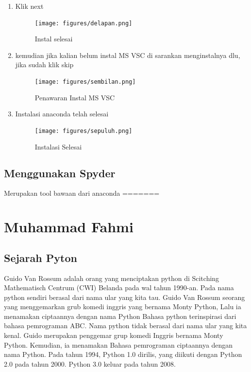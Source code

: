 \begin{enumerate}
    \item Klik next
    \begin{figure}[!htbp]
        \centering
        \texttt{[image: figures/delapan.png]}
        \caption{Instal selesai}
        \label{Proses}
        \end{figure}

    \item kemudian jika kalian belum instal MS VSC di sarankan menginstalnya dlu, jika sudah klik skip
    \begin{figure}[!htbp]
        \centering
        \texttt{[image: figures/sembilan.png]}
        \caption{Penawaran Instal MS VSC}
        \label{offering}
        \end{figure}

    \item Instalasi anaconda telah selesai
    \begin{figure}[!htbp]
        \centering
        \texttt{[image: figures/sepuluh.png]}
        \caption{Instalasi Selesai}
        \label{akhir}
        \end{figure}
\end{enumerate}
\subsection{Menggunakan Spyder}
Merupakan tool bawaan dari anaconda
=======
\section{Muhammad Fahmi}

\subsection{Sejarah Pyton}
Guido Van Rossum adalah orang yang menciptakan python di Scitching Mathematisch Centrum (CWI) Belanda pada wal tahun 1990-an. 
Pada nama python sendiri berasal dari nama ular yang kita tau. Guido Van Rossum seorang yang menggemarkan grub komedi inggris yang bernama Monty Python, Lalu ia menamakan ciptaannya dengan nama Python
Bahasa python terinspirasi dari bahasa pemrograman ABC. Nama python tidak berasal dari nama ular yang kita kenal. Guido merupakan penggemar grup komedi Inggris bernama Monty Python. Kemudian, ia menamakan Bahasa pemrograman ciptaannya dengan nama Python.
Pada tahun 1994, Python 1.0 dirilis, yang diikuti dengan Python 2.0 pada tahun 2000. Python 3.0 keluar pada tahun 2008.

